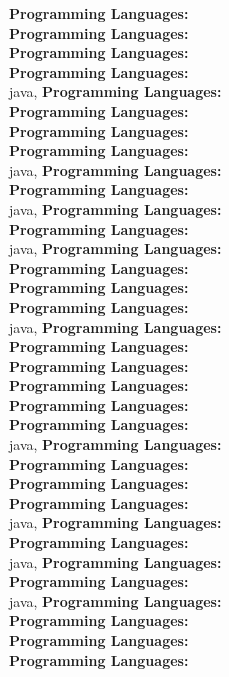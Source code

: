 \textbf{Programming Languages:} \\
\textbf{Programming Languages:} \\
\textbf{Programming Languages:} \\
\textbf{Programming Languages:} \\
java, \textbf{Programming Languages:} \\
\textbf{Programming Languages:} \\
\textbf{Programming Languages:} \\
\textbf{Programming Languages:} \\
java, \textbf{Programming Languages:} \\
\textbf{Programming Languages:} \\
java, \textbf{Programming Languages:} \\
\textbf{Programming Languages:} \\
java, \textbf{Programming Languages:} \\
\textbf{Programming Languages:} \\
\textbf{Programming Languages:} \\
\textbf{Programming Languages:} \\
java, \textbf{Programming Languages:} \\
\textbf{Programming Languages:} \\
\textbf{Programming Languages:} \\
\textbf{Programming Languages:} \\
\textbf{Programming Languages:} \\
\textbf{Programming Languages:} \\
java, \textbf{Programming Languages:} \\
\textbf{Programming Languages:} \\
\textbf{Programming Languages:} \\
\textbf{Programming Languages:} \\
java, \textbf{Programming Languages:} \\
\textbf{Programming Languages:} \\
java, \textbf{Programming Languages:} \\
\textbf{Programming Languages:} \\
java, \textbf{Programming Languages:} \\
\textbf{Programming Languages:} \\
\textbf{Programming Languages:} \\
\textbf{Programming Languages:} \\
